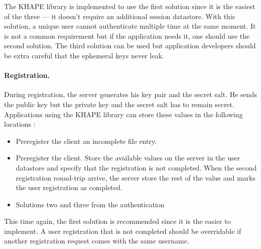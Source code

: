 ﻿\documentclass[../report.tex]{subfiles}
\begin{document}
The KHAPE library is implemented to use the first solution since it is the easiest of the three --- it doesn't require an additional session datastore. With this solution, a unique user cannot authenticate multiple time at the same moment. It is not a common requirement but if the application needs it, one should use the second solution.
The third solution can be used but application developers should be extra careful that the ephemeral keys never leak.
 

\paragraph{Registration.}
During registration, the server generates his key pair and the secret salt. He sends the public key but the private key and the secret salt has to remain secret. Applications using the KHAPE library can store these values in the following locations :

\begin{itemize}
 \item Preregister the client an incomplete file entry.
 \item Preregister the client. Store the available values on the server in the user datastore and specify that the registration is not completed. When the second registration round-trip arrive, the server store the rest of the value and marks the user registration as completed.
 \item Solutions two and three from the authentication
\end{itemize}

This time again, the first solution is recommended since it is the easier to implement.
A user registration that is not completed should be overridable if another registration request comes with the same username.
\end{document}

